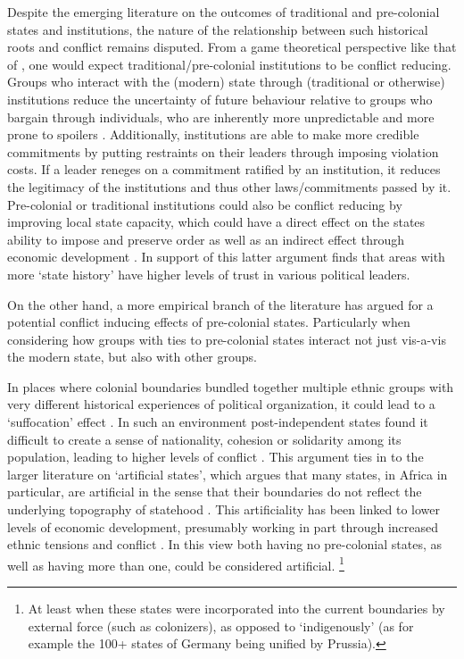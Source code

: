\documentclass[12pt]{article}
\begin{document}
Despite the emerging literature on the outcomes of traditional and pre-colonial
states and institutions, the nature of the relationship between such historical
roots and conflict remains disputed. From a game theoretical perspective like
that of \citet{Fearon1995}, one would expect traditional/pre-colonial
institutions to be conflict reducing. Groups who interact with the (modern)
state through (traditional or otherwise) institutions reduce the uncertainty of
future behaviour relative to groups who bargain through individuals, who are
inherently more unpredictable and more prone to spoilers \citep{Wig2016}.
Additionally, institutions are able to make more credible commitments by putting
restraints on their leaders through imposing violation costs. If a leader
reneges on a commitment ratified by an institution, it reduces the legitimacy of
the institutions and thus other laws/commitments passed by it. Pre-colonial or
traditional institutions could also be conflict reducing by improving local
state capacity, which could have a direct effect on the states ability to impose
and preserve order as well as an indirect effect through economic development
\citep{Depetris-Chauvin2016}. In support of this latter argument
\citet{Depetris-Chauvin2016} finds that areas with more `state history' have
higher levels of trust in various political leaders.

On the other hand, a more empirical branch of the literature has argued for a
potential conflict inducing effects of pre-colonial states. Particularly when
considering how groups with ties to pre-colonial states interact not just
vis-a-vis the modern state, but also with other groups.

In places where colonial boundaries bundled together multiple ethnic groups with
very different historical experiences of political organization, it could lead
to a `suffocation' effect \citep{Englebert2002}. In such an environment
post-independent states found it difficult to create a sense of nationality,
cohesion or solidarity among its population, leading to higher levels of
conflict \citep{Englebert2002}. This argument ties in to the larger literature
on `artificial states', which argues that many states, in Africa in particular,
are artificial in the sense that their boundaries do not reflect the underlying
topography of statehood \citep{Alesina2011}. This artificiality has been linked
to lower levels of economic development, presumably working in part through
increased ethnic tensions and conflict \citep{Alesina2011}. In this view both
having no pre-colonial states, as well as having more than one, could be
considered artificial. %
\footnote{At least when these states were incorporated
into the current boundaries by external force (such as colonizers), as opposed
to `indigenously' (as for example the 100+ states of Germany being unified by
Prussia).} 
\end{document}
